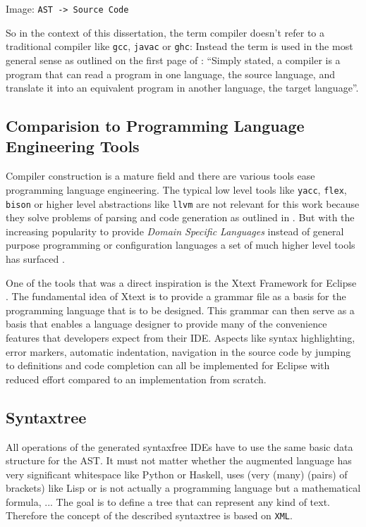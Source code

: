 Image: \texttt{AST -> Source Code}

So in the context of this dissertation, the term compiler doesn't refer to a traditional compiler like \texttt{gcc}, \texttt{javac} or \texttt{ghc}: Instead the term is used in the most general sense as outlined on the first page of \cite{dragon_book}: \enquote{Simply stated, a compiler is a program that can read a program in one language, the source language, and translate it into an equivalent program in another language, the target language}.

\subsection{Comparision to Programming Language Engineering Tools}

Compiler construction is a mature field and there are various tools ease programming language engineering. The typical low level tools like \texttt{yacc}, \texttt{flex}, \texttt{bison} or higher level abstractions like \texttt{llvm} are not relevant for this work because they solve problems of parsing and code generation as outlined in . But with the increasing popularity to provide \textit{Domain Specific Languages} instead of general purpose programming or configuration languages a set of much higher level tools has surfaced \cite{mernik_dsl_2005}.

One of the tools that was a direct inspiration is the Xtext Framework for Eclipse \cite{efftinge_xtext}. The fundamental idea of Xtext is to provide a grammar file as a basis for the programming language that is to be designed. This grammar can then serve as a basis that enables a language designer to provide many of the convenience features that developers expect from their IDE. Aspects like syntax highlighting, error markers, automatic indentation, navigation in the source code by jumping to definitions and code completion can all be implemented for Eclipse with reduced effort compared to an implementation from scratch.

\subsection{Syntaxtree}

All operations of the generated syntaxfree IDEs have to use the same basic data structure for the AST. It must not matter whether the augmented language has very significant whitespace like Python or Haskell, uses (very (many) (pairs) of brackets) like Lisp or is not actually a programming language but a mathematical formula, ... The goal is to define a tree that can represent any kind of text. Therefore the concept of the described syntaxtree is based on \texttt{XML}\cite{xml_spec}.

